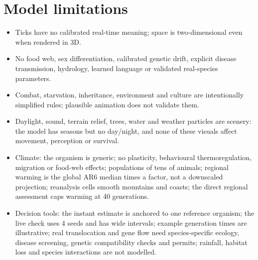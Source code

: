 \section{Model limitations}
\begin{itemize}[leftmargin=*]
\item Ticks have no calibrated real-time meaning; space is two-dimensional even when
rendered in 3D.
\item No food web, sex differentiation, calibrated genetic drift, explicit disease
transmission, hydrology, learned language or validated real-species parameters.
\item Combat, starvation, inheritance, environment and culture are intentionally
simplified rules; plausible animation does not validate them.
\item Daylight, sound, terrain relief, trees, water and weather particles are
scenery: the model has seasons but no day/night, and none of these visuals affect
movement, perception or survival.
\item Climate: the organism is generic; no plasticity, behavioural
thermoregulation, migration or food-web effects; populations of tens of animals;
regional warming is the global AR6 median times a factor, not a downscaled
projection; reanalysis cells smooth mountains and coasts; the direct regional
assessment caps warming at 40 generations.
\item Decision tools: the instant estimate is anchored to one reference organism;
the live check uses 4 seeds and has wide intervals; example generation times are
illustrative; real translocation and gene flow need species-specific ecology,
disease screening, genetic compatibility checks and permits; rainfall, habitat loss
and species interactions are not modelled.
\end{itemize}

